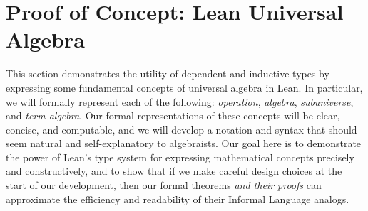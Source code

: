 \documentclass[11pt]{amsart}  %
\begin{document}










\section{Proof of Concept: Lean Universal Algebra}
\label{sec:proof-of-concept}

This section demonstrates the utility of dependent and inductive types 
by expressing some fundamental concepts of universal algebra in Lean.  
In particular, we will formally represent each of the following:  
\emph{operation}, \emph{algebra}, \emph{subuniverse}, and \emph{term algebra}.
Our formal representations of these concepts will be clear, concise, and computable, and we will develop a notation and syntax that should seem natural and self-explanatory to algebraists. Our goal here is to demonstrate the power of Lean's type system for expressing mathematical concepts precisely and constructively, and to show that if we make careful design choices at the start of our development, then our formal theorems \emph{and their proofs} can approximate the efficiency and readability of their Informal Language analogs.
\end{document}
